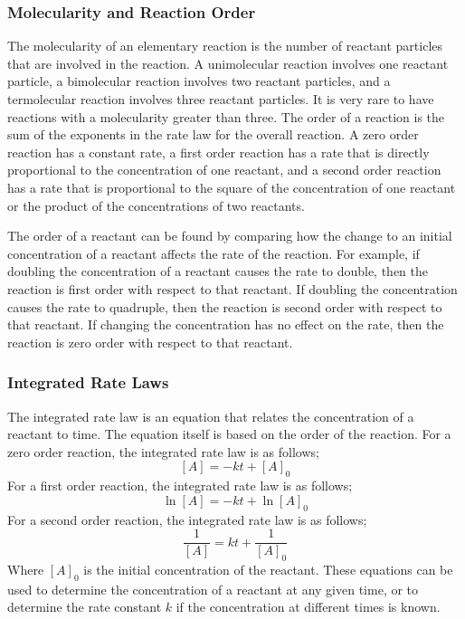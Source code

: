 \subsubsection{Molecularity and Reaction Order}
The molecularity of an elementary reaction is the number of reactant particles that are involved in the reaction. A unimolecular reaction involves one reactant particle, a bimolecular reaction involves two reactant particles, and a termolecular reaction involves three reactant particles. It is very rare to have reactions with a molecularity greater than three. The order of a reaction is the sum of the exponents in the rate law for the overall reaction. A zero order reaction has a constant rate, a first order reaction has a rate that is directly proportional to the concentration of one reactant, and a second order reaction has a rate that is proportional to the square of the concentration of one reactant or the product of the concentrations of two reactants.

The order of a reactant can be found by comparing how the change to an initial concentration of a reactant affects the rate of the reaction. For example, if doubling the concentration of a reactant causes the rate to double, then the reaction is first order with respect to that reactant. If doubling the concentration causes the rate to quadruple, then the reaction is second order with respect to that reactant. If changing the concentration has no effect on the rate, then the reaction is zero order with respect to that reactant.

\subsubsection{Integrated Rate Laws}
The integrated rate law is an equation that relates the concentration of a reactant to time. The equation itself is based on the order of the reaction. For a zero order reaction, the integrated rate law is as follows;
\begin{equation}\label{eq:zeroOrder}
    [A] = -kt + [A]_0
\end{equation}
For a first order reaction, the integrated rate law is as follows;
\begin{equation}\label{eq:firstOrder}
    \ln{[A]} = -kt + \ln{[A]_0}
\end{equation}
For a second order reaction, the integrated rate law is as follows;
\begin{equation}\label{eq:secondOrder}
    \frac{1}{[A]} = kt + \frac{1}{[A]_0}
\end{equation}
Where $[A]_0$ is the initial concentration of the reactant. These equations can be used to determine the concentration of a reactant at any given time, or to determine the rate constant $k$ if the concentration at different times is known.

